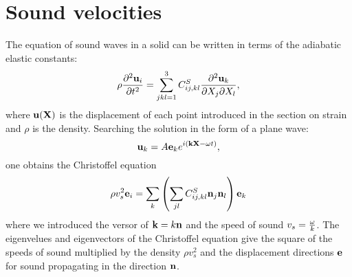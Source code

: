 \documentclass[12pt,a4paper,twoside]{report}
\begin{document}

\newpage
{\color{dark-blue}\chapter{Sound velocities}}
\color{black}
The equation of sound waves in a solid can be written in terms of the
adiabatic elastic constants:
\begin{equation}
\rho {\partial^2 {\bf u}_i \over \partial t^2} = \sum_{jkl=1}^3 C^S_{ij,kl} 
{\partial^2 {\bf u}_k \over \partial X_j \partial X_l},
\end{equation}
where ${\bf u}({\bf X})$ is the displacement of each point introduced
in the section on strain and $\rho$ is the density.
Searching the solution in the form of a plane wave:
\begin{equation}
{\bf u}_k = A {\bf e}_k e^{i ({\bf k} {\bf X} - \omega t)},
\end{equation}
one obtains the Christoffel equation
\begin{equation}
\rho v_s^2 {\bf e}_i = \sum_k \left( \sum_{jl} C^S_{ij,kl} {\bf n}_j {\bf n}_l
\right) {\bf e}_k
\end{equation}
where we introduced the versor of ${\bf k}=k {\bf n}$ and the speed of sound
$v_s = {\omega \over k}$. The eigenvelues and eigenvectors of the 
Christoffel equation give the square of the speeds of sound multiplied
by the density $\rho v_s^2$ and the displacement directions ${\bf e}$
for sound propagating in the direction ${\bf n}$.
\end{document}
